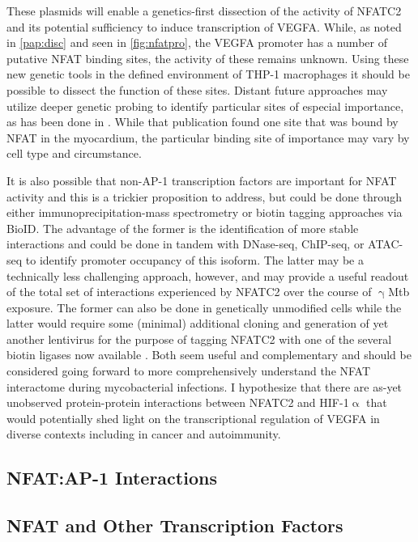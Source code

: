 \doublespacing

These plasmids will enable a genetics-first dissection of the activity of NFATC2 and its potential sufficiency to induce transcription of VEGFA. While, as noted in \autoref{pap:disc} and seen in \autoref{fig:nfatpro}, the VEGFA promoter has a number of putative NFAT binding sites, the activity of these remains unknown. Using these new genetic tools in the defined environment of THP-1 macrophages it should be possible to dissect the function of these sites. Distant future approaches may utilize deeper genetic probing to identify particular sites of especial importance, as has been done in \citet{Chang2004}. While that publication found one site that was bound by NFAT in the myocardium, the particular binding site of importance may vary by cell type and circumstance. 

It is also possible that non-AP-1 transcription factors are important for NFAT activity and this is a trickier proposition to address, but could be done through either immunoprecipitation-mass spectrometry or biotin tagging approaches via BioID. The advantage of the former is the identification of more stable interactions and could be done in tandem with DNase-seq, ChIP-seq, or ATAC-seq to identify promoter occupancy of this isoform. The latter may be a technically less challenging approach, however, and may provide a useful readout of the total set of interactions experienced by NFATC2 over the course of $\upgamma$Mtb exposure. The former can also be done in genetically unmodified cells while the latter would require some (minimal) additional cloning and generation of yet another lentivirus for the purpose of tagging NFATC2 with one of the several biotin ligases now available \citep{Cho2020}. Both seem useful and complementary and should be considered going forward to more comprehensively understand the NFAT interactome during mycobacterial infections. I hypothesize that there are as-yet unobserved protein-protein interactions between NFATC2 and HIF-1$\upalpha$ that would potentially shed light on the transcriptional regulation of VEGFA in diverse contexts including in cancer and autoimmunity. 

\subsection{NFAT:AP-1 Interactions}

\citep{Macian2001}

\subsection{NFAT and Other Transcription Factors}

